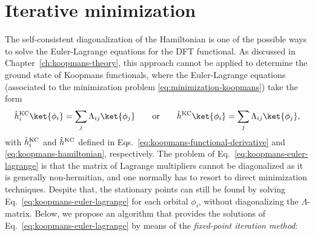 \chapter{Iterative minimization\label{app:iterative-minimization}}

The self-consistent diagonalization of the Hamiltonian is one of the possible ways to solve the Euler-Lagrange equations for the DFT functional. As discussed in Chapter~\ref{ch:koopmans-theory}, this approach cannot be applied to determine the ground state of Koopmans functionals, where the Euler-Lagrange equations (associated to the minimization problem \eqref{eq:minimization-koopmans}) take the form
%
\begin{equation}
    \hat{h}^{\rm KC}_i \ket{\phi_i} = \sum_j \Lambda_{ij} \ket{\phi_j} \qquad \text{or} \qquad
    \hat{h}^{\rm KC} \ket{\phi_i} = \sum_j \Lambda_{ij} \ket{\phi_j} ,
    \label{eq:koopmans-euler-lagrange}
\end{equation}
%
with $\hat{h}^{\rm KC}_i$ and $\hat{h}^{\rm KC}$ defined in Eqs.~\eqref{eq:koopmans-functional-derivative} and \eqref{eq:koopmans-hamiltonian}, respectively. The problem of Eq.~\eqref{eq:koopmans-euler-lagrange} is that the matrix of Lagrange multipliers cannot be diagonalized as it is generally non-hermitian, and one normally has to resort to direct minimization techniques. Despite that, the stationary points can still be found by solving Eq.~\eqref{eq:koopmans-euler-lagrange} for each orbital $\phi_i$, without diagonalizing the $\Lambda$-matrix. Below, we propose an algorithm that provides the solutions of Eq.~\eqref{eq:koopmans-euler-lagrange} by means of the \emph{fixed-point iteration method}:
%
